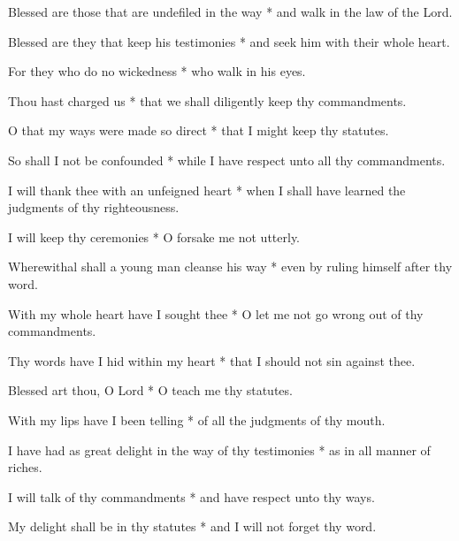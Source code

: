 Blessed are those that are undefiled in the way * and walk in the law of the Lord.

Blessed are they that keep his testimonies * and seek him with their whole heart.

For they who do no wickedness * who walk in his eyes.

Thou hast charged us * that we shall diligently keep thy commandments.

O that my ways were made so direct * that I might keep thy statutes.

So shall I not be confounded * while I have respect unto all thy commandments.

I will thank thee with an unfeigned heart * when I shall have learned the judgments of thy righteousness.

I will keep thy ceremonies * O forsake me not utterly.

Wherewithal shall a young man cleanse his way * even by ruling himself after thy word.

With my whole heart have I sought thee * O let me not go wrong out of thy commandments.

Thy words have I hid within my heart * that I should not sin against thee.

Blessed art thou, O Lord * O teach me thy statutes.

With my lips have I been telling * of all the judgments of thy mouth.

I have had as great delight in the way of thy testimonies * as in all manner of riches.

I will talk of thy commandments * and have respect unto thy ways.

My delight shall be in thy statutes * and I will not forget thy word.